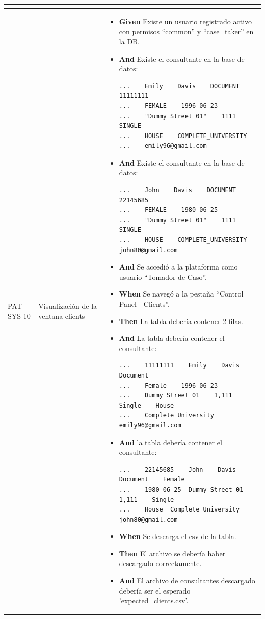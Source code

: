\begin{longtable}{|p{1cm}|p{2.5cm}|p{12cm}|}
\begin{itemize}
    \end{itemize}
    \\
    \hline
    PAT-SYS-10 & Visualización de la ventana clients &
    \begin{itemize}
        \item \textbf{Given} Existe un usuario registrado activo con permisos ``common'' y ``case\_taker'' en la DB.
        \item \textbf{And} Existe el consultante en la base de datos:
        \begin{verbatim}
...    Emily    Davis    DOCUMENT    11111111
...    FEMALE    1996-06-23
...    "Dummy Street 01"    1111    SINGLE
...    HOUSE    COMPLETE_UNIVERSITY
...    emily96@gmail.com
        \end{verbatim}
        \item \textbf{And} Existe el consultante en la base de datos:
        \begin{verbatim}
...    John    Davis    DOCUMENT    22145685
...    FEMALE    1980-06-25
...    "Dummy Street 01"    1111    SINGLE
...    HOUSE    COMPLETE_UNIVERSITY   john80@gmail.com
        \end{verbatim}
        \item \textbf{And} Se accedió a la plataforma como usuario ``Tomador de Caso''.
        \item \textbf{When} Se navegó a la pestaña ``Control Panel - Clients''.
        \item \textbf{Then} La tabla debería contener 2 filas.
        \item \textbf{And} La tabla debería contener el consultante:
        \begin{verbatim}
...    11111111    Emily    Davis    Document
...    Female    1996-06-23
...    Dummy Street 01    1,111    Single    House
...    Complete University   emily96@gmail.com
        \end{verbatim}
        \item \textbf{And} la tabla debería contener el consultante:
           \begin{verbatim}
...    22145685    John    Davis    Document    Female
...    1980-06-25  Dummy Street 01    1,111    Single
...    House  Complete University   john80@gmail.com
       \end{verbatim}
        \item \textbf{When} Se descarga el csv de la tabla.
        \item \textbf{Then} El archivo se debería haber descargado correctamente.
        \item \textbf{And} El archivo de consultantes descargado debería ser el esperado 'expected\_clients.csv'.

\end{itemize}
\end{longtable}
